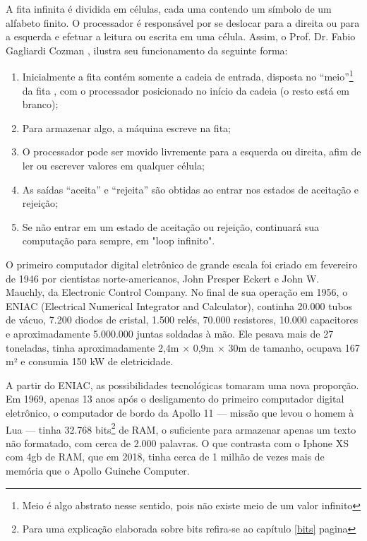 A fita infinita é dividida em células, cada uma contendo um símbolo de um alfabeto finito. O processador é responsável por se deslocar para a direita ou para a esquerda e efetuar a leitura ou escrita em uma célula. Assim, o Prof. Dr. Fabio Gagliardi Cozman \cite{7}, ilustra seu funcionamento da seguinte forma:
\begin{enumerate}
  \item Inicialmente a fita contém somente a cadeia de entrada, disposta no ``meio''\footnote{Meio é algo abstrato nesse sentido, pois não existe meio de um valor infinito} da fita , com o processador posicionado no início da cadeia (o resto está em branco);
  \item Para armazenar algo, a máquina escreve na fita;
  \item O processador pode ser movido livremente para a esquerda ou direita, afim de ler ou escrever valores em qualquer célula;
  \item As saídas ``aceita'' e ``rejeita'' são obtidas ao entrar nos estados de aceitação e rejeição;
  \item Se não entrar em um estado de aceitação ou rejeição, continuará sua computação para sempre, em "loop infinito".
\end{enumerate}

O primeiro computador digital eletrônico de grande escala foi criado em fevereiro de 1946 por cientistas norte-americanos, John Presper Eckert e John W. Mauchly, da Electronic Control Company. No final de sua operação em 1956, o ENIAC (Electrical Numerical Integrator and Calculator), continha 20.000 tubos de vácuo, 7.200 diodos de cristal, 1.500 relés, 70.000 resistores, 10.000 capacitores e aproximadamente 5.000.000 juntas soldadas à mão. Ele pesava mais de 27 toneladas, tinha aproximadamente 2,4m × 0,9m × 30m de tamanho, ocupava 167 m² e consumia 150 kW de eletricidade. \cite{2}

A partir do ENIAC, as possibilidades tecnológicas tomaram uma nova proporção. Em 1969, apenas 13 anos após o desligamento do primeiro computador digital eletrônico, o computador de bordo da Apollo 11 — missão que levou o homem  à Lua — tinha 32.768 bits\footnote{Para uma explicação elaborada sobre bits refira-se ao capítulo \ref{bits} pagina \pageref{bits}} de RAM, o suficiente para armazenar apenas um texto não formatado, com cerca de 2.000 palavras. O que contrasta com o Iphone XS com 4gb de RAM, que em 2018, tinha cerca de 1 milhão de vezes mais de memória que o Apollo Guinche Computer. \cite{5}

